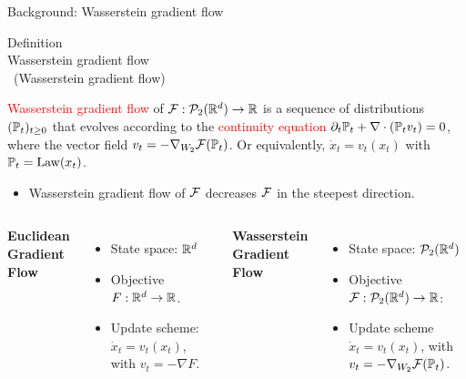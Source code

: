 \documentclass[aspectratio=169,xcolor=dvipsnames]{beamer}
\newtheorem{defi}{Definition}
\renewenvironment{defi}[1][]{%
  \begin{alertblock}{Definition\ifx\\#1\\\else~(#1)\fi}%
}{%
  \end{alertblock}%
}
\newcommand{\red}[1]{\textcolor{red}{#1}}
\begin{document}
\begin{frame}{Background: Wasserstein gradient  flow}
\begin{defi}[Wasserstein gradient  flow]
\red{Wasserstein gradient flow} of $\mathcal{F}:\mathcal{P}_2(\mathbb{R}^d)\to\mathbb{R}$ is a sequence of distributions $(\mathbb{P}_t)_{t\geq 0}$ that evolves according to the \red{continuity equation} $\partial_t \mathbb{P}_t+\nabla \cdot \left(\mathbb{P}_t v_t\right)=0$,
where the vector field $v_t = -\nabla_{W_2}\mathcal{F}(\mathbb{P}_t)$.
Or equivalently, $\dot{x}_t = v_t(x_t)$ with $\mathbb{P}_t = \mathrm{Law}(x_t)$.
\end{defi}
\begin{itemize}
    \item Wasserstein gradient flow of $\mathcal{F}$ decreases $\mathcal{F}$ in the steepest direction. 
\end{itemize}
\begin{columns}[T]
    \textbf{Euclidean Gradient Flow}
    \begin{itemize}
        \item State space: $\mathbb{R}^d$
        \item Objective $F: \mathbb{R}^d \to \mathbb{R}$.
        \item Update scheme: $\dot{x}_t = v_t(x_t)$, with $v_t = -\nabla F$.
    \end{itemize}
    
    \textbf{Wasserstein Gradient Flow}
    \begin{itemize}
        \item State space: $\mathcal{P}_2(\mathbb{R}^d)$
        \item Objective $\mathcal{F}: \mathcal{P}_2(\mathbb{R}^d) \to \mathbb{R}$:
        \item Update scheme $\dot{x}_t = v_t(x_t)$, with $v_t = -\nabla_{W_2} \mathcal{F}(\mathbb{P}_t)$.
    \end{itemize}
\end{columns}
\end{frame}
\end{document}
